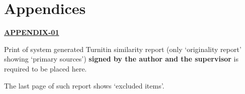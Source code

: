 \section{Appendices}

\clearpage
\begin{flushright}
{\fontsize{16}{19}\selectfont\bfseries\underline{APPENDIX-01}}
\end{flushright}

Print of system generated Turnitin similarity report (only `originality report' showing `primary sources') \textbf{signed by the author and the supervisor} is required to be placed here.

\begin{center}
The last page of such report shows `excluded items'.
\end{center}

